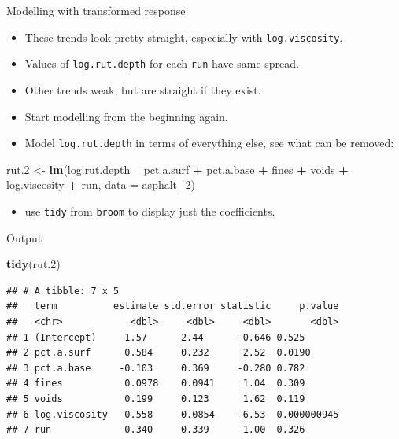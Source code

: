 \documentclass[ignorenonframetext,]{beamer}
\newenvironment{Shaded}{\begin{snugshade}}{\end{snugshade}}
\newcommand{\DataTypeTok}[1]{\textcolor[rgb]{0.13,0.29,0.53}{#1}}
\newcommand{\DecValTok}[1]{\textcolor[rgb]{0.00,0.00,0.81}{#1}}
\newcommand{\FloatTok}[1]{\textcolor[rgb]{0.00,0.00,0.81}{#1}}
\newcommand{\KeywordTok}[1]{\textcolor[rgb]{0.13,0.29,0.53}{\textbf{#1}}}
\newcommand{\NormalTok}[1]{#1}
\newcommand{\OperatorTok}[1]{\textcolor[rgb]{0.81,0.36,0.00}{\textbf{#1}}}
\newcommand{\StringTok}[1]{\textcolor[rgb]{0.31,0.60,0.02}{#1}}
\providecommand{\tightlist}{%
  \setlength{\itemsep}{0pt}\setlength{\parskip}{0pt}}
\begin{document}
\begin{frame}[fragile]{Modelling with transformed response}
\protect\hypertarget{modelling-with-transformed-response}{}

\begin{itemize}
\tightlist
\item
  These trends look pretty straight, especially with
  \texttt{log.viscosity}.
\item
  Values of \texttt{log.rut.depth} for each \texttt{run} have same
  spread.
\item
  Other trends weak, but are straight if they exist.
\item
  Start modelling from the beginning again.
\item
  Model \texttt{log.rut.depth} in terms of everything else, see what can
  be removed:
\end{itemize}

\begin{Shaded}
\begin{Highlighting}[]
\NormalTok{rut}\FloatTok{.2}\NormalTok{ <-}\StringTok{ }\KeywordTok{lm}\NormalTok{(log.rut.depth }\OperatorTok{~}\StringTok{ }\NormalTok{pct.a.surf }\OperatorTok{+}\StringTok{ }\NormalTok{pct.a.base }\OperatorTok{+}
\StringTok{  }\NormalTok{fines }\OperatorTok{+}\StringTok{ }\NormalTok{voids }\OperatorTok{+}\StringTok{ }\NormalTok{log.viscosity }\OperatorTok{+}\StringTok{ }\NormalTok{run, }\DataTypeTok{data =}\NormalTok{ asphalt_}\DecValTok{2}\NormalTok{)}
\end{Highlighting}
\end{Shaded}

\begin{itemize}
\tightlist
\item
  use \texttt{tidy} from \texttt{broom} to display just the
  coefficients.
\end{itemize}

\end{frame}

\begin{frame}[fragile]{Output}
\protect\hypertarget{output}{}

\begin{Shaded}
\begin{Highlighting}[]
\KeywordTok{tidy}\NormalTok{(rut}\FloatTok{.2}\NormalTok{)}
\end{Highlighting}
\end{Shaded}

\begin{verbatim}
## # A tibble: 7 x 5
##   term          estimate std.error statistic     p.value
##   <chr>            <dbl>     <dbl>     <dbl>       <dbl>
## 1 (Intercept)    -1.57      2.44      -0.646 0.525      
## 2 pct.a.surf      0.584     0.232      2.52  0.0190     
## 3 pct.a.base     -0.103     0.369     -0.280 0.782      
## 4 fines           0.0978    0.0941     1.04  0.309      
## 5 voids           0.199     0.123      1.62  0.119      
## 6 log.viscosity  -0.558     0.0854    -6.53  0.000000945
## 7 run             0.340     0.339      1.00  0.326
\end{verbatim}

\end{frame}
\end{document}
